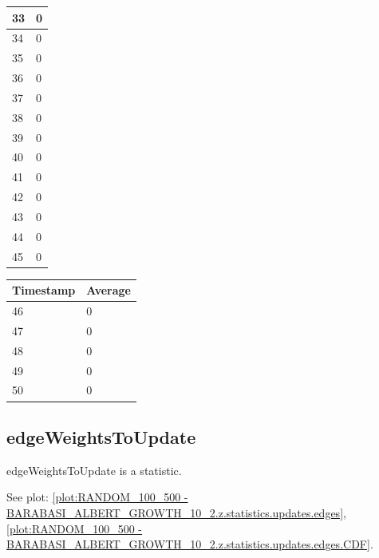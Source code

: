 \begin{tabular}{|l||l|}
	33 & 0 \\ \hline
	34 & 0 \\ \hline
	35 & 0 \\ \hline
	36 & 0 \\ \hline
	37 & 0 \\ \hline
	38 & 0 \\ \hline
	39 & 0 \\ \hline
	40 & 0 \\ \hline
	41 & 0 \\ \hline
	42 & 0 \\ \hline
	43 & 0 \\ \hline
	44 & 0 \\ \hline
	45 & 0 \\ \hline
\end{tabular}
\begin{tabular}{|l||l|}
\hline
	\textbf{Timestamp} & \textbf{Average} \\ \hline
	46 & 0 \\ \hline
	47 & 0 \\ \hline
	48 & 0 \\ \hline
	49 & 0 \\ \hline
	50 & 0 \\ \hline
\end{tabular}

\subsection{edgeWeightsToUpdate}
edgeWeightsToUpdate is a statistic.

See plot: \ref{plot:RANDOM_100_500 - BARABASI_ALBERT_GROWTH_10_2.z.statistics.updates.edges}, \ref{plot:RANDOM_100_500 - BARABASI_ALBERT_GROWTH_10_2.z.statistics.updates.edges.CDF}.

